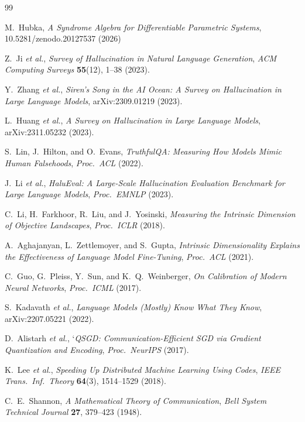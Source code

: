 \documentclass[11pt,a4paper]{article}
\begin{document}
\newpage

\begin{thebibliography}{99}

M.~Hubka, \emph{A Syndrome Algebra for Differentiable Parametric Systems},
10.5281/zenodo.20127537 (2026)

Z.~Ji \textit{et al.}, \emph{Survey of Hallucination in Natural Language Generation},
\emph{ACM Computing Surveys} \textbf{55}(12), 1--38 (2023).

Y.~Zhang \textit{et al.}, \emph{Siren's Song in the AI Ocean: A Survey on Hallucination in Large Language Models},
arXiv:2309.01219 (2023).

L.~Huang \textit{et al.}, \emph{A Survey on Hallucination in Large Language Models},
arXiv:2311.05232 (2023).

S.~Lin, J.~Hilton, and O.~Evans, \emph{TruthfulQA: Measuring How Models Mimic Human Falsehoods},
\emph{Proc.\ ACL} (2022).

J.~Li \textit{et al.}, \emph{HaluEval: A Large-Scale Hallucination Evaluation Benchmark for Large Language Models},
\emph{Proc.\ EMNLP} (2023).

C.~Li, H.~Farkhoor, R.~Liu, and J.~Yosinski, \emph{Measuring the Intrinsic Dimension of Objective Landscapes},
\emph{Proc.\ ICLR} (2018).

A.~Aghajanyan, L.~Zettlemoyer, and S.~Gupta, \emph{Intrinsic Dimensionality Explains the Effectiveness of Language Model Fine-Tuning},
\emph{Proc.\ ACL} (2021).

C.~Guo, G.~Pleiss, Y.~Sun, and K.~Q.~Weinberger, \emph{On Calibration of Modern Neural Networks},
\emph{Proc.\ ICML} (2017).

S.~Kadavath \textit{et al.}, \emph{Language Models (Mostly) Know What They Know},
arXiv:2207.05221 (2022).

D.~Alistarh \textit{et al.}, `\emph{QSGD: Communication-Efficient SGD via Gradient Quantization and Encoding},
\emph{Proc.\ NeurIPS} (2017).

K.~Lee \textit{et al.}, \emph{Speeding Up Distributed Machine Learning Using Codes},
\emph{IEEE Trans.\ Inf.\ Theory} \textbf{64}(3), 1514--1529 (2018).

C.~E.~Shannon, \emph{A Mathematical Theory of Communication},
\emph{Bell System Technical Journal} \textbf{27}, 379--423 (1948).


\end{thebibliography}
\end{document}
